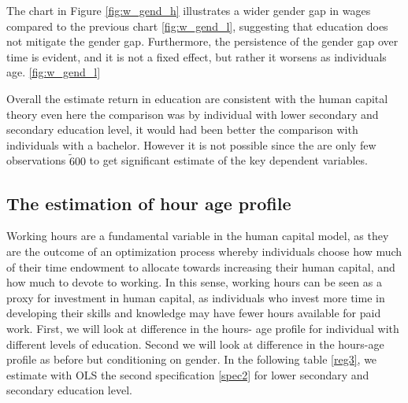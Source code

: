 \documentclass[14pt]{sistedes}
\begin{document}
The chart in Figure \ref{fig:w_gend_h} illustrates a wider gender gap in wages compared to the previous chart
\ref{fig:w_gend_l}, suggesting that education does not mitigate the gender gap. Furthermore, the persistence of the
gender gap over time is evident, and it is not a fixed effect, but rather it worsens as individuals age.
\ref{fig:w_gend_l}

Overall the estimate return in education are consistent with the human capital theory even here the comparison was by
individual with lower secondary and secondary education level, it would had been better the comparison with individuals
with a bachelor. However it is not possible since the are only few observations $\tilde 600$ to get significant estimate
of the key dependent variables.

\subsection{The estimation of hour age profile}
Working hours are a fundamental variable in the human capital model, as they are the outcome of an optimization process
whereby individuals choose how much of their time endowment to allocate towards increasing their human capital, and how
much to devote to working. In this sense, working hours can be seen as a proxy for investment in human capital, as
individuals who invest more time in developing their skills and knowledge may have fewer hours available for paid
work.\newline
First, we will look at difference in the hours- age profile for individual with different levels of education. Second we
will look at difference in the hours-age profile as before but conditioning on gender. In the following table
\ref{reg3}, we estimate with OLS the second specification \ref{spec2} for lower secondary and secondary education level.
\end{document}

